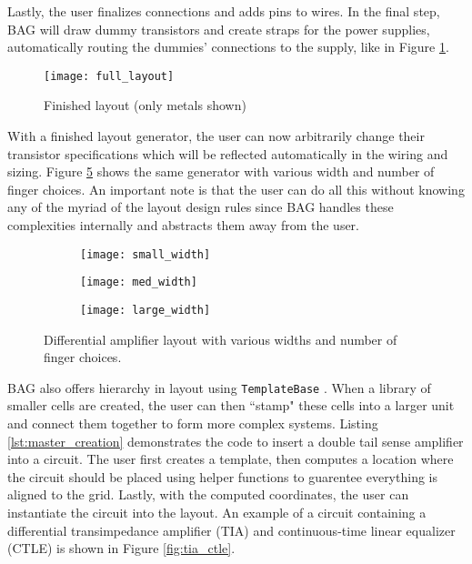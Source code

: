 Lastly, the user finalizes connections and adds pins to wires. In the final step, BAG will draw dummy transistors and create straps for the power supplies, automatically routing the dummies' connections to the supply, like in Figure \ref{fig:finished_layout}.
\begin{figure}[h]
\centering
\texttt{[image: full\_layout]}
\caption{Finished layout (only metals shown)}
\label{fig:finished_layout}
\end{figure}
With a finished layout generator, the user can now arbitrarily change their transistor specifications which will be reflected automatically in the wiring and sizing. Figure \ref{fig:width_changes} shows the same generator with various width and number of finger choices. An important note is that the user can do all this without knowing any of the myriad of the layout design rules since BAG handles these complexities internally and abstracts them away from the user.
\begin{figure}[h]
\centering
\begin{subfigure}{.4\linewidth}
  \centering
  \texttt{[image: small\_width]}
  \caption{}
  \label{fig:sfig1}
\end{subfigure}
\begin{subfigure}{.4\linewidth}
  \centering
\texttt{[image: med\_width]}
  \caption{}
  \label{fig:sfig2}
\end{subfigure}
\begin{subfigure}{.4\linewidth}
  \centering
\texttt{[image: large\_width]}
  \caption{}
  \label{fig:sfig2}
\end{subfigure}
\caption{Differential amplifier layout with various widths and number of finger choices.}
\label{fig:width_changes}
\end{figure}
\clearpage
BAG also offers hierarchy in layout using \texttt{TemplateBase} \cite{chang_bag2:_2018}. When a library of smaller cells are created, the user can then ``stamp" these cells into a larger unit and connect them together to form more complex systems. Listing \ref{lst:master_creation} demonstrates the code to insert a double tail sense amplifier into a circuit. The user first creates a template, then computes a location where the circuit should be placed using helper functions to guarentee everything is aligned to the grid. Lastly, with the computed coordinates, the user can instantiate the circuit into the layout. An example of a circuit containing a differential transimpedance amplifier (TIA) and continuous-time linear equalizer (CTLE) is shown in Figure \ref{fig:tia_ctle}.
